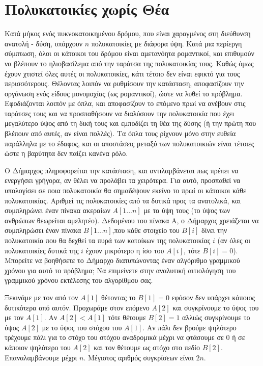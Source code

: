 \section{Πολυκατοικίες χωρίς Θέα}
\begin{textit}
    Κατά μήκος ενός πυκνοκατοικημένου δρόμου, που είναι χαραγμένος στη
    διεύθυνση ανατολή - δύση, υπάρχουν $n$ πολυκατοικίες με διάφορα ύψη. Κατά
    μια περίεργη σύμπτωση, όλοι οι κάτοικοι του δρόμου είναι αμετανόητα
    ρομαντικοί, και επιθυμούν να βλέπουν το ηλιοβασίλεμα από την ταράτσα της
    πολυκατοικίας τους. Καθώς όμως έχουν χτιστεί όλες αυτές οι πολυκατοικίες,
    κάτι τέτοιο δεν είναι εφικτό για τους περισσότερους. Θέλοντας λοιπόν να
    ρυθμίσουν την κατάσταση, αποφασίζουν την οργάνωση ενός είδους μονομαχίας
    (ως ρομαντικοί), ώστε να λυθεί το πρόβλημα. Εφοδιάζονται λοιπόν με όπλα,
    και αποφασίζουν το επόμενο πρωί να ανέβουν στις ταράτσες τους και να
    προσπαθήσουν να διαλύσουν την πολυκατοικία που έχει μεγαλύτερο ύψος από τη
    δική τους και εμποδίζει τη θέα της δύσης (ή την πρώτη που βλέπουν από
    αυτές, αν είναι πολλές). Τα όπλα τους ρίχνουν μόνο στην ευθεία παράλληλα
    με το έδαφος, και οι αποστάσεις μεταξύ των πολυκατοικιών είναι τέτοιες
    ώστε η βαρύτητα δεν παίζει κανένα ρόλο.
\end{textit}

\begin{textit}
    Ο Δήμαρχος πληροφορείται την κατάσταση, και αντιλαμβάνεται πως πρέπει να
    ενεργήσει γρήγορα, αν θέλει να προλάβει τα χειρότερα. Για αυτό, προσπαθεί
    να υπολογίσει σε ποια πολυκατοικία θα σημαδέψουν εκείνο το πρωί οι
    κάτοικοι κάθε πολυκατοικίας. Αριθμεί τις πολυκατοικίες από τα δυτικά προς
    τα ανατολικά, και συμπληρώνει έναν πίνακα ακεραίων $A[1...n]$ με τα ύψη
    τους (το ύψος των ανθρώπων θεωρείται αμελητέο). Δεδομένου του πίνακα Α, ο
    Δήμαρχος χρειάζεται να συμπληρώσει έναν πίνακα $B[1...n]$,που κάθε
    στοιχείο του $B[i]$ δίνει την πολυκατοικία που θα δεχθεί τα πυρά των
    κατοίκων της πολυκατοικίας $i$ (αν όλες οι πολυκατοικίες δυτικά της $i$
    έχουν μικρότερο η ίσο του $A[i]$, τότε $B[i]=0$). Μπορείτε να βοηθήσετε το
    Δήμαρχο διατυπώνοντας έναν αλγόριθμο γραμμικού χρόνου για αυτό το
    πρόβλημα; Να επιμείνετε στην αναλυτική αιτιολόγηση του γραμμικού χρόνου
    εκτέλεσης του αλγορίθμου σας.
\end{textit}
\vspace{0.4cm}

Ξεκινάμε με τον από τον $A[1]$ θέτοντας το $B[1]=0$ εφόσον δεν υπάρχει κάποιος
δυτικότερα από αυτόν. Προχωράμε στον επόμενο $A[2]$ και συγκρίνουμε το ύψος
του με τον $A[1]$. Αν $A[2]<A[1]$ τότε θέτουμε $B[2]=1$ αλλιώς συγκρίνουμε το
ύψος $A[2]$ με το ύψος του στόχου του $A[1]$. Αν πάλι δεν βρούμε ψηλότερο
τρέχουμε πάλι για το στόχο του στόχου αναδρομικά μέχρι να φτάσουμε σε 0
ή σε κάποιον ψηλότερο του $A[2]$ και τον θέτουμε ως στόχο στο πεδίο $B[2]$.
Επαναλαμβάνουμε μέχρι $n$. Μέγιστος αριθμός συγκρίσεων είναι $2n$.


